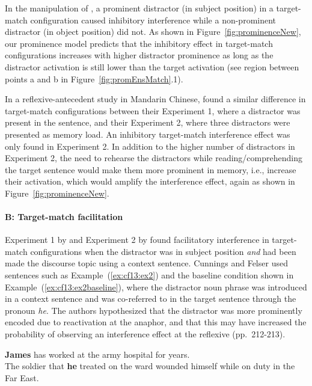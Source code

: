 \documentclass{cambridge7A}\usepackage[]{graphicx}\usepackage[]{color}
\begin{document}
In the manipulation of \cite{VanDykeMcElree2011}, a prominent distractor (in subject position) in a target-match configuration caused inhibitory interference while a non-prominent distractor (in object position) did not. As shown in Figure~\ref{fig:prominenceNew}, our prominence model predicts that the inhibitory effect in target-match configurations increases with higher distractor prominence as long as the distractor activation is still lower than the target activation (see region between points a and b in Figure~\ref{fig:promEnsMatch}.1).

In a reflexive-antecedent study in Mandarin Chinese, \cite{JaegerEngelmannVasishth2015} found a similar difference in target-match configurations between their Experiment 1, where a distractor was present in the sentence, and their Experiment 2, where three distractors were presented as memory load. An inhibitory target-match interference effect was only found in Experiment 2. 
In addition to the higher number of distractors in Experiment 2, the need to rehearse the distractors 
while reading/comprehending the target sentence
 would make them more prominent in memory, i.e., increase their activation, which would amplify the interference effect, again as shown in Figure~\ref{fig:prominenceNew}.

\paragraph{B: Target-match facilitation}
Experiment 1 by \cite{Sturt2003} and Experiment 2 by \cite{CunningsFelser2013} found  facilitatory interference in target-match configurations when the distractor was in subject position \emph{and} had been made the discourse topic using a context sentence.
Cunnings and Felser used sentences such as Example~(\ref{ex:cf13:ex2}) and the baseline condition shown in Example~(\ref{ex:cf13:ex2baseline}), where the distractor noun phrase was introduced in a context sentence and was co-referred to in the target sentence through the pronoun \textit{he}. 
The authors hypothesized that the distractor was more prominently encoded due to reactivation at the anaphor, and that this may have increased the probability of observing an interference effect at the reflexive (pp.\ 212-213). 

\begin{exe} 
\ex\label{ex:cf13:ex2}
\textbf{James} has worked at the army hospital for years. \\
The soldier that \textbf{he} treated on the ward wounded himself while on duty in the Far East.
\end{exe}
\end{document}
